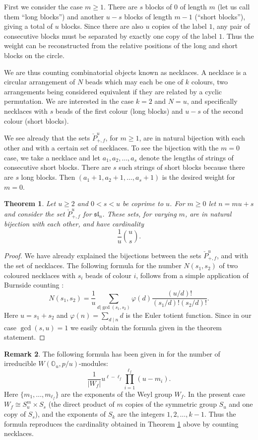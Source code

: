 \documentclass[12pt]{amsart}
\theoremstyle{plain}
\newtheorem{thm}{Theorem}[section]
\theoremstyle{definition}
\newtheorem{rem}[thm]{Remark}
\numberwithin{equation}{section}
\newcommand{\sll}{\mathfrak{sl}}
\newcommand{\mbo}{\mathbb{O}}
\begin{document}
First we consider the case $m \geq 1$. There are $s$ blocks of $0$ of length $m$ (let us call them ``long blocks'') and another $u-s$ blocks of length $m-1$ (``short blocks''), giving a total of $u$ blocks. Since there are also $u$ copies of the label $1$, any pair of consecutive blocks must be separated by exactly one copy of the label $1$. Thus the weight can be reconstructed from the relative positions of the long and short blocks on the circle.

We are thus counting combinatorial objects known as necklaces. A necklace is a circular arrangement of $N$ beads which may each be one of $k$ colours, two arrangements being considered equivalent if they are related by a cyclic permutation. We are interested in the case $k=2$ and $N = u$, and specifically necklaces with $s$ beads of the first colour (long blocks) and $u-s$ of the second colour (short blocks). 

We see already that the sets $\check{P}_{+, f}^u$, for $m \geq 1$, are in natural bijection with each other and with a certain set of necklaces. To see the bijection with the $m=0$ case, we take a necklace and let $a_1, a_2, \ldots, a_s$ denote the lengths of strings of consecutive short blocks. There are $s$ such strings of short blocks because there are $s$ long blocks. Then $(a_1+1, a_2+1, \ldots, a_s+1)$ is the desired weight for $m=0$.
\begin{thm}\label{thm:bijections}
Let $u \geq 2$ and $0 < s < u$ be coprime to $u$. For $m \geq 0$ let $n = mu+s$ and consider the set $\check{P}_{+, f}^u$ for $\sll_n$. These sets, for varying $m$, are in natural bijection with each other, and have cardinality
\[
\frac{1}{u} \binom{u}{s}.
\]
\end{thm}

\begin{proof}
We have already explained the bijections between the sets $\check{P}_{+, f}^u$, and with the set of necklaces. The following formula for the number $N(s_1, s_2)$ of two coloured necklaces with $s_i$ beads of colour $i$, follows from a simple application of Burnside counting {\cite[p. 491]{Stanley.vol2}}:
\[
N(s_1, s_2) = \frac{1}{u} \sum_{d | \gcd(s_1, s_2)} \varphi(d) \frac{(u/d)!}{(s_1/d)!(s_2/d)!}.
\]
Here $u=s_1+s_2$ and $\varphi(n) = \sum_{d \mid n} d$ is the Euler totient function. Since in our case $\gcd(s, u) = 1$ we easily obtain the formula given in the theorem statement.
\end{proof}


\begin{rem}
The following formula has been given in {\cite[Proposition 3.4]{SXY2024}} for the number of irreducible $W(\mbo_u, p/u)$-modules:
\[
\frac{1}{|W_f|}u^{\ell-\ell_f}\prod_{i=1}^{\ell_f} (u-m_i).
\]
Here $\{m_1, \ldots, m_{\ell_f}\}$ are the exponents of the Weyl group $W_f$. In the present case $W_f \cong S_u^m \times S_s$ (the direct product of $m$ copies of the symmetric group $S_u$ and one copy of $S_s$), and the exponents of $S_k$ are the integers $1, 2, \ldots, k-1$. Thus the formula reproduces the cardinality obtained in Theorem \ref{thm:bijections} above by counting necklaces.
\end{rem}
\end{document}
